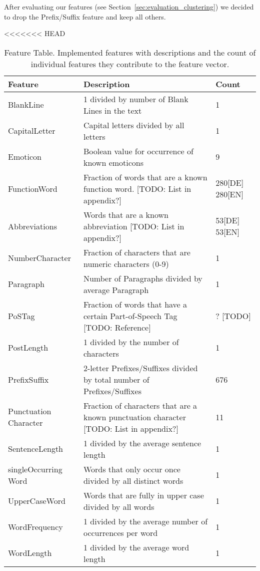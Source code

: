 After evaluating our features (see Section~\ref{sec:evaluation_clustering}) we decided to drop the Prefix/Suffix feature and keep all others.


<<<<<<< HEAD
\begin{table}[tbp]
    \begin{center}
    \begin{tabular}{|p{2.6cm}|p{8.2cm}|p{1.2cm}|}
    \hline
    Feature					& Description																	& Count				\\ \hline
    BlankLine				& 1 divided by number of Blank Lines in the text								& 1					\\ \hline
    CapitalLetter			& Capital letters divided by all letters										& 1					\\ \hline
    Emoticon				& Boolean value for occurrence of known emoticons								& 9					\\ \hline
    FunctionWord			& Fraction of words that are a known function word. [TODO: List in appendix?]	& 280[DE] 280[EN]	\\ \hline
    Abbreviations			& Words that are a known abbreviation [TODO: List in appendix?]					& 53[DE] 53[EN]		\\ \hline
    NumberCharacter			& Fraction of characters that are numeric characters (0-9)						& 1					\\ \hline
    Paragraph				& Number of Paragraphs divided by average Paragraph								& 1					\\ \hline
    PoSTag					& Fraction of words that have a certain Part-of-Speech Tag [TODO: Reference]	& ? [TODO]			\\ \hline
    PostLength				& 1 divided by the number of characters											& 1					\\ \hline
    PrefixSuffix			& 2-letter Prefixes/Suffixes divided by total number of Prefixes/Suffixes		& 676 			 	\\ \hline
    Punctuation Character	& Fraction of characters that are a known punctuation character [TODO: List in appendix?]	& 11				\\ \hline
    SentenceLength			& 1 divided by the average sentence length										& 1 				\\ \hline
    singleOccurring Word	& Words that only occur once divided by all distinct words						& 1					\\ \hline
    UpperCaseWord			& Words that are fully in upper case divided by all words						& 1					\\ \hline
    WordFrequency			& 1 divided by the average number of occurrences per word						& 1					\\ \hline
    WordLength				& 1 divided by the average word length											& 1					\\ \hline
    \end{tabular}
    \end{center}
	\caption{Feature Table. Implemented features with descriptions and the count of individual features they contribute to the feature vector.}
	\label{tab:featureTable}
\end{table}
